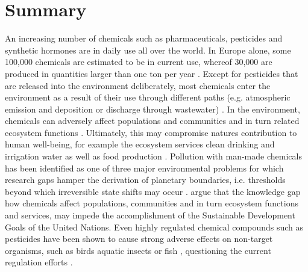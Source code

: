 \section{Summary}
An increasing number of chemicals such as pharmaceuticals, pesticides and synthetic hormones are in daily use all over the world. In Europe alone, some 100,000 chemicals are estimated to be in current use, whereof 30,000 are produced in quantities larger than one ton per year \citep{breithaupt_costs_2006}. Except for pesticides that are released into the environment deliberately, most chemicals enter the environment as a result of their use through different paths (e.g. atmospheric emission and deposition or discharge through wastewater) \citep{schwarzenbach_challenge_2006}. In the environment, chemicals can adversely affect populations and communities and in turn related ecosystem functions \citep{schafer_thresholds_2012, malaj_organic_2014, hallmann_declines_2014, barracaracciolo_pharmaceuticals_2015, johnston_review_2015}. Ultimately, this may compromise natures contribution to human well-being, for example the ecosystem services clean drinking and irrigation water as well as food production \citep{peters_review_2013, vandersluijs_neonicotinoids_2013, yamamuro_neonicotinoids_2019}. 
Pollution with man-made chemicals has been identified as one of three major environmental problems for which research gaps hamper the derivation of planetary boundaries, i.e. thresholds beyond which irreversible state shifts may occur \citep{steffen_anthropocene_2007, steffen_planetary_2015}. \citet{bernhardt_synthetic_2017} argue that the knowledge gap how chemicals affect populations, communities and in turn ecosystem functions and services, may impede the accomplishment of the Sustainable Development Goals \citep{rosa_transforming_2017} of the United Nations. Even highly regulated chemical compounds such as pesticides have been shown to cause strong adverse effects on non-target organisms, such as birds \citep{hallmann_declines_2014} aquatic insects \citep{beketov_pesticides_2013} or fish \citep{yamamuro_neonicotinoids_2019}, questioning the current regulation efforts \citep{schafer_future_2019}.


